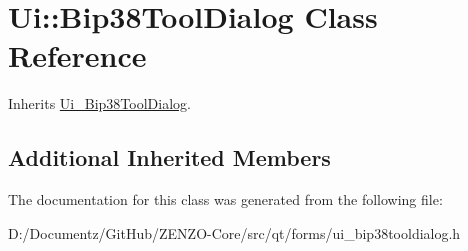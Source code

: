 \hypertarget{class_ui_1_1_bip38_tool_dialog}{}\section{Ui\+::Bip38\+Tool\+Dialog Class Reference}
\label{class_ui_1_1_bip38_tool_dialog}


Inherits \mbox{\hyperlink{class_ui___bip38_tool_dialog}{Ui\+\_\+\+Bip38\+Tool\+Dialog}}.

\subsection*{Additional Inherited Members}


The documentation for this class was generated from the following file\+:\begin{DoxyCompactItemize}
\item 
D\+:/\+Documentz/\+Git\+Hub/\+Z\+E\+N\+Z\+O-\/\+Core/src/qt/forms/ui\+\_\+bip38tooldialog.\+h\end{DoxyCompactItemize}
